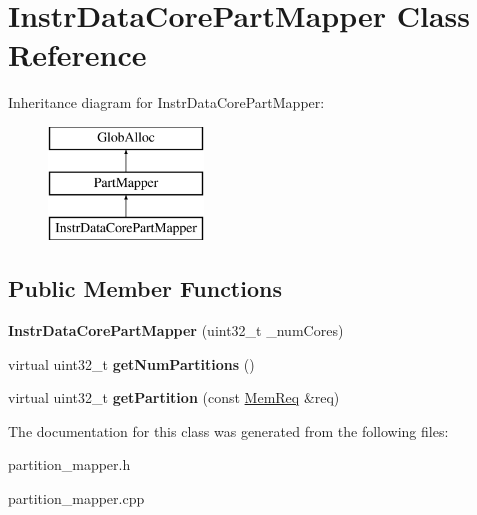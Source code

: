 \hypertarget{classInstrDataCorePartMapper}{\section{Instr\-Data\-Core\-Part\-Mapper Class Reference}
\label{classInstrDataCorePartMapper}
}
Inheritance diagram for Instr\-Data\-Core\-Part\-Mapper\-:\begin{figure}[H]
\begin{center}
\leavevmode
\includegraphics[height=3.000000cm]{classInstrDataCorePartMapper}
\end{center}
\end{figure}
\subsection*{Public Member Functions}
\begin{DoxyCompactItemize}
\item 
\hypertarget{classInstrDataCorePartMapper_a447aa17c7bcfe4ad3955064a51184f11}{{\bfseries Instr\-Data\-Core\-Part\-Mapper} (uint32\-\_\-t \-\_\-num\-Cores)}\label{classInstrDataCorePartMapper_a447aa17c7bcfe4ad3955064a51184f11}

\item 
\hypertarget{classInstrDataCorePartMapper_a1008e1e594fac3edd532babd89b8a4ba}{virtual uint32\-\_\-t {\bfseries get\-Num\-Partitions} ()}\label{classInstrDataCorePartMapper_a1008e1e594fac3edd532babd89b8a4ba}

\item 
\hypertarget{classInstrDataCorePartMapper_ad4610e28ad9d45a77e79bca8d8c434ed}{virtual uint32\-\_\-t {\bfseries get\-Partition} (const \hyperlink{structMemReq}{Mem\-Req} \&req)}\label{classInstrDataCorePartMapper_ad4610e28ad9d45a77e79bca8d8c434ed}

\end{DoxyCompactItemize}


The documentation for this class was generated from the following files\-:\begin{DoxyCompactItemize}
\item 
partition\-\_\-mapper.\-h\item 
partition\-\_\-mapper.\-cpp\end{DoxyCompactItemize}
